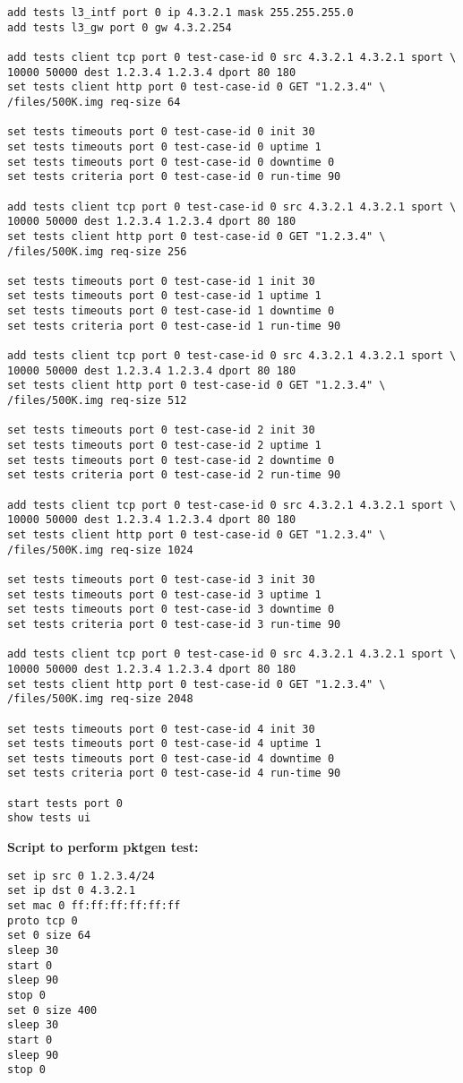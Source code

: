\begin{verbatim}
add tests l3_intf port 0 ip 4.3.2.1 mask 255.255.255.0
add tests l3_gw port 0 gw 4.3.2.254

add tests client tcp port 0 test-case-id 0 src 4.3.2.1 4.3.2.1 sport \ 
10000 50000 dest 1.2.3.4 1.2.3.4 dport 80 180
set tests client http port 0 test-case-id 0 GET "1.2.3.4" \
/files/500K.img req-size 64

set tests timeouts port 0 test-case-id 0 init 30
set tests timeouts port 0 test-case-id 0 uptime 1
set tests timeouts port 0 test-case-id 0 downtime 0
set tests criteria port 0 test-case-id 0 run-time 90

add tests client tcp port 0 test-case-id 0 src 4.3.2.1 4.3.2.1 sport \ 
10000 50000 dest 1.2.3.4 1.2.3.4 dport 80 180
set tests client http port 0 test-case-id 0 GET "1.2.3.4" \
/files/500K.img req-size 256

set tests timeouts port 0 test-case-id 1 init 30
set tests timeouts port 0 test-case-id 1 uptime 1
set tests timeouts port 0 test-case-id 1 downtime 0
set tests criteria port 0 test-case-id 1 run-time 90

add tests client tcp port 0 test-case-id 0 src 4.3.2.1 4.3.2.1 sport \ 
10000 50000 dest 1.2.3.4 1.2.3.4 dport 80 180
set tests client http port 0 test-case-id 0 GET "1.2.3.4" \
/files/500K.img req-size 512

set tests timeouts port 0 test-case-id 2 init 30
set tests timeouts port 0 test-case-id 2 uptime 1
set tests timeouts port 0 test-case-id 2 downtime 0
set tests criteria port 0 test-case-id 2 run-time 90

add tests client tcp port 0 test-case-id 0 src 4.3.2.1 4.3.2.1 sport \ 
10000 50000 dest 1.2.3.4 1.2.3.4 dport 80 180
set tests client http port 0 test-case-id 0 GET "1.2.3.4" \
/files/500K.img req-size 1024

set tests timeouts port 0 test-case-id 3 init 30
set tests timeouts port 0 test-case-id 3 uptime 1
set tests timeouts port 0 test-case-id 3 downtime 0
set tests criteria port 0 test-case-id 3 run-time 90

add tests client tcp port 0 test-case-id 0 src 4.3.2.1 4.3.2.1 sport \ 
10000 50000 dest 1.2.3.4 1.2.3.4 dport 80 180
set tests client http port 0 test-case-id 0 GET "1.2.3.4" \
/files/500K.img req-size 2048

set tests timeouts port 0 test-case-id 4 init 30
set tests timeouts port 0 test-case-id 4 uptime 1
set tests timeouts port 0 test-case-id 4 downtime 0
set tests criteria port 0 test-case-id 4 run-time 90

start tests port 0
show tests ui
\end{verbatim}
\textbf{Script to perform pktgen test:}
\begin{verbatim}
set ip src 0 1.2.3.4/24
set ip dst 0 4.3.2.1
set mac 0 ff:ff:ff:ff:ff:ff
proto tcp 0
set 0 size 64
sleep 30
start 0
sleep 90
stop 0
set 0 size 400
sleep 30
start 0
sleep 90
stop 0
\end{verbatim}

